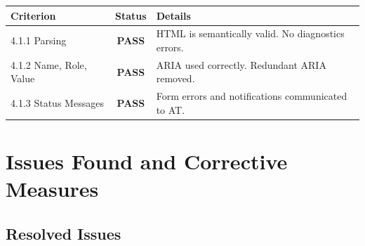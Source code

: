 \documentclass[12pt,a4paper]{article}
\newcommand{\pass}{\textcolor{passgreen}{\textbf{PASS}}}
\begin{document}
\begin{table}[H]
\centering
\begin{tabularx}{\textwidth}{lcX}
\toprule
\textbf{Criterion} & \textbf{Status} & \textbf{Details} \\
\midrule
4.1.1 Parsing          & \pass & HTML is semantically valid. No diagnostics errors. \\
4.1.2 Name, Role, Value& \pass & ARIA used correctly. Redundant ARIA removed. \\
4.1.3 Status Messages  & \pass & Form errors and notifications communicated to AT. \\
\bottomrule
\end{tabularx}
\end{table}

\section{Issues Found and Corrective Measures}

\subsection{Resolved Issues}
\end{document}
